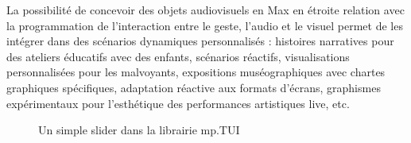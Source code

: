 \noindent La possibilité de concevoir des objets audiovisuels en Max en étroite relation avec la programmation de l'interaction entre le geste, l'audio et le visuel permet de les intégrer dans des scénarios dynamiques personnalisés : histoires narratives pour des ateliers éducatifs avec des enfants, scénarios réactifs, visualisations personnalisées pour les malvoyants, expositions muséographiques avec chartes graphiques spécifiques, adaptation réactive aux formats d'écrans, graphismes expérimentaux pour l'esthétique des performances artistiques live, etc.
\begin{figure}[!htbp]
	\caption{Un simple slider dans la librairie mp.TUI}
\end{figure}

